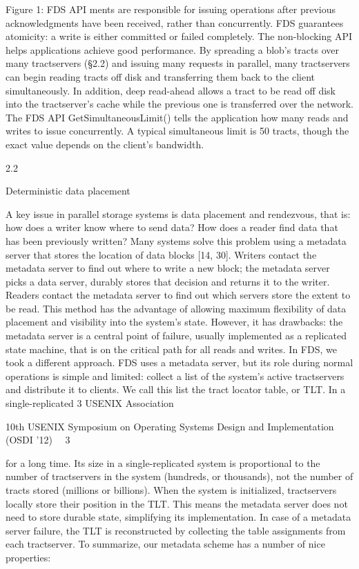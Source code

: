 Figure 1: FDS API
ments are responsible for issuing operations after previous acknowledgments have been received, rather than
concurrently. FDS guarantees atomicity: a write is either
committed or failed completely.
The non-blocking API helps applications achieve
good performance. By spreading a blob’s tracts over
many tractservers (§2.2) and issuing many requests in
parallel, many tractservers can begin reading tracts off
disk and transferring them back to the client simultaneously. In addition, deep read-ahead allows a tract
to be read off disk into the tractserver’s cache while
the previous one is transferred over the network. The
FDS API GetSimultaneousLimit() tells the application how many reads and writes to issue concurrently. A
typical simultaneous limit is 50 tracts, though the exact
value depends on the client’s bandwidth.

2.2

Deterministic data placement

A key issue in parallel storage systems is data placement and rendezvous, that is: how does a writer know
where to send data? How does a reader find data that has
been previously written?
Many systems solve this problem using a metadata
server that stores the location of data blocks [14, 30].
Writers contact the metadata server to find out where
to write a new block; the metadata server picks a data
server, durably stores that decision and returns it to the
writer. Readers contact the metadata server to find out
which servers store the extent to be read. This method
has the advantage of allowing maximum flexibility of
data placement and visibility into the system’s state.
However, it has drawbacks: the metadata server is a central point of failure, usually implemented as a replicated
state machine, that is on the critical path for all reads and
writes.
In FDS, we took a different approach. FDS uses a
metadata server, but its role during normal operations
is simple and limited: collect a list of the system’s active tractservers and distribute it to clients. We call this
list the tract locator table, or TLT. In a single-replicated
3
USENIX Association  

10th USENIX Symposium on Operating Systems Design and Implementation (OSDI ’12)  3


for a long time. Its size in a single-replicated system is
proportional to the number of tractservers in the system
(hundreds, or thousands), not the number of tracts stored
(millions or billions).
When the system is initialized, tractservers locally
store their position in the TLT. This means the metadata
server does not need to store durable state, simplifying its
implementation. In case of a metadata server failure, the
TLT is reconstructed by collecting the table assignments
from each tractserver.
To summarize, our metadata scheme has a number of
nice properties:

